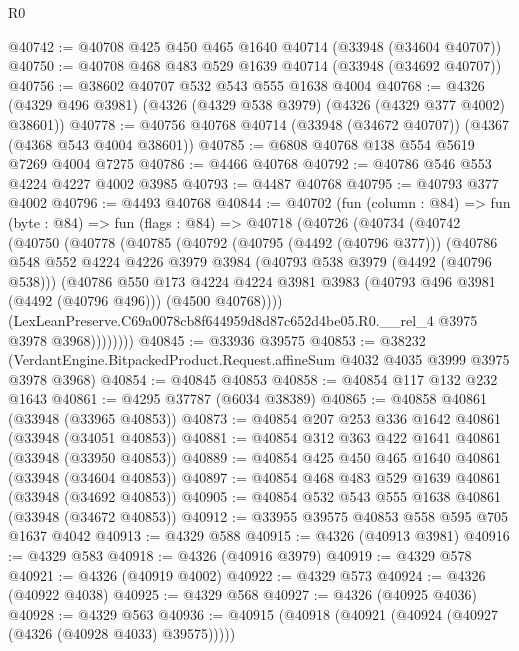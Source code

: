 \begin{lexlean}{R0}
\begin{coremodule}
@40742 := @40708 @425 @450 @465 @1640 @40714 (@33948 (@34604 @40707))
@40750 := @40708 @468 @483 @529 @1639 @40714 (@33948 (@34692 @40707))
@40756 := @38602 @40707 @532 @543 @555 @1638 @4004
@40768 := @4326 (@4329 @496 @3981) (@4326 (@4329 @538 @3979) (@4326 (@4329 @377 @4002) @38601))
@40778 := @40756 @40768 @40714 (@33948 (@34672 @40707)) (@4367 (@4368 @543 @4004 @38601))
@40785 := @6808 @40768 @138 @554 @5619 @7269 @4004 @7275
@40786 := @4466 @40768
@40792 := @40786 @546 @553 @4224 @4227 @4002 @3985
@40793 := @4487 @40768
@40795 := @40793 @377 @4002
@40796 := @4493 @40768
@40844 := @40702
    (fun (column : @84) =>
    fun (byte : @84) =>
    fun (flags : @84) =>
    @40718
      (@40726
        (@40734
          (@40742
            (@40750
              (@40778
                (@40785
                  (@40792
                    (@40795 (@4492 (@40796 @377)))
                    (@40786
                      @548
                      @552
                      @4224
                      @4226
                      @3979
                      @3984
                      (@40793 @538 @3979 (@4492 (@40796 @538)))
                      (@40786
                        @550
                        @173
                        @4224
                        @4224
                        @3981
                        @3983
                        (@40793 @496 @3981 (@4492 (@40796 @496)))
                        (@4500 @40768))))
                  (LexLeanPreserve.C69a0078cb8f644959d8d87c652d4be05.R0.__rel_4
                    @3975
                    @3978
                    @3968))))))))
@40845 := @33936 @39575
@40853 := @38232
    (VerdantEngine.BitpackedProduct.Request.affineSum @4032 @4035 @3999 @3975 @3978 @3968)
@40854 := @40845 @40853
@40858 := @40854 @117 @132 @232 @1643
@40861 := @4295 @37787 (@6034 @38389)
@40865 := @40858 @40861 (@33948 (@33965 @40853))
@40873 := @40854 @207 @253 @336 @1642 @40861 (@33948 (@34051 @40853))
@40881 := @40854 @312 @363 @422 @1641 @40861 (@33948 (@33950 @40853))
@40889 := @40854 @425 @450 @465 @1640 @40861 (@33948 (@34604 @40853))
@40897 := @40854 @468 @483 @529 @1639 @40861 (@33948 (@34692 @40853))
@40905 := @40854 @532 @543 @555 @1638 @40861 (@33948 (@34672 @40853))
@40912 := @33955 @39575 @40853 @558 @595 @705 @1637 @4042
@40913 := @4329 @588
@40915 := @4326 (@40913 @3981)
@40916 := @4329 @583
@40918 := @4326 (@40916 @3979)
@40919 := @4329 @578
@40921 := @4326 (@40919 @4002)
@40922 := @4329 @573
@40924 := @4326 (@40922 @4038)
@40925 := @4329 @568
@40927 := @4326 (@40925 @4036)
@40928 := @4329 @563
@40936 := @40915 (@40918 (@40921 (@40924 (@40927 (@4326 (@40928 @4033) @39575)))))

\end{coremodule}
\end{lexlean}
